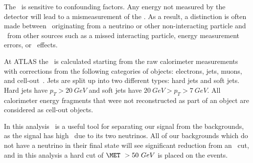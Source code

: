 The \MET\ is sensitive to confounding factors. Any energy not measured by the detector will lead to a mismeasurement of the \MET. As a result, a distinction is often made between \MET\ originating from a neutrino or other non-interacting particle and \MET\ from other sources such as a missed interacting particle, energy measurement errors, or \pileup\ effects.

At ATLAS the \MET\ is calculated starting from the raw calorimeter measurements with corrections from the following categories of objects: electrons, jets, muons, and cell-out~\cite{MET}. Jets are split up into two different types: hard jets and soft jets. Hard jets have $p_T > 20\ GeV$ and soft jets have $20\ GeV > p_T > 7\ GeV$. All calorimeter energy fragments that were not reconstructed as part of an object are considered as cell-out objects. 

In this analysis \MET\ is a useful tool for separating our signal from the backgrounds, as the signal has high \MET\ due to its two neutrinos. All of our backgrounds which do not have a neutrino in their final state will see significant reduction from an \MET\ cut, and in this analysis a hard cut of $\MET\ > 50\ GeV$ is placed on the events. 


